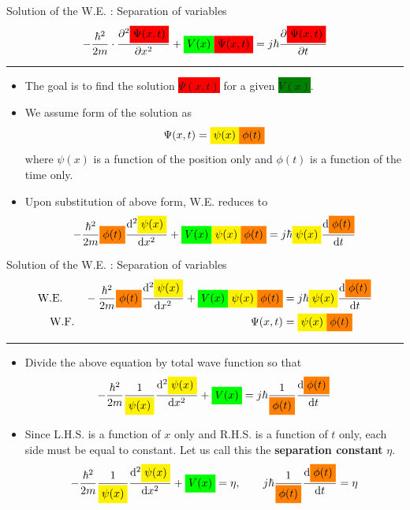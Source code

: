 \begin{frame}{Solution of the W.E. : Separation of variables}
	\[
	-\frac{\hbar^2}{2m} \cdot \frac{\partial^2 \colorbox{red}{$\Psi(x, t)$}}{\partial x^2} + \colorbox{green}{$V(x)$} \colorbox{red}{$\Psi(x, t)$}= j \hbar \frac{\partial \colorbox{red}{$\Psi(x, t)$}}{\partial t}
	\]
	\hrule
	\begin{itemize}
		\item The goal is to find the solution \colorbox{red}{$\Psi(x, t)$} for a given \colorbox{green}{$V(x)$}.
		\item We assume form of the solution as
		\[
			\Psi(x, t) = \colorbox{yellow}{$\psi(x)$} \colorbox{orange}{$\phi(t)$}
		\]
		where \(\psi(x)\) is a function of the position only and \(\phi(t)\) is a function of the time only.
		\item Upon substitution of above form, W.E. reduces to
		\[
		-\frac{\hbar^2}{2m} \colorbox{orange}{$\phi(t)$} \frac{\mathrm{d}^2 \colorbox{yellow}{$\psi(x)$}}{\mathrm{d} x^2}
		+
		\colorbox{green}{$V(x)$} \colorbox{yellow}{$\psi(x)$} \colorbox{orange}{$\phi(t)$}
		=
		j \hbar \colorbox{yellow}{$\psi(x)$}
		\frac{\mathrm{d} \colorbox{orange}{$\phi(t)$}}{\mathrm{d} t}
		\]
	\end{itemize}
\end{frame}
%
\begin{frame}{Solution of the W.E. : Separation of variables}
	\begin{align*}
	\text{W.E.} \qquad
	-\frac{\hbar^2}{2m} \colorbox{orange}{$\phi(t)$} \frac{\mathrm{d}^2 \colorbox{yellow}{$\psi(x)$}}{\mathrm{d} x^2}
	+
	\colorbox{green}{$V(x)$} \colorbox{yellow}{$\psi(x)$} \colorbox{orange}{$\phi(t)$}
	&=
	j \hbar \colorbox{yellow}{$\psi(x)$}
	\frac{\mathrm{d} \colorbox{orange}{$\phi(t)$}}{\mathrm{d} t}
	\\
	\text{W.F.} \qquad  \qquad\qquad\qquad \qquad\qquad\qquad \qquad
	\Psi(x, t) &= \colorbox{yellow}{$\psi(x)$} \colorbox{orange}{$\phi(t)$}
	\end{align*}
	\hrule
	\begin{itemize}
		\item Divide the above equation by total wave function so that
		\[
		-\frac{\hbar^2}{2m} \frac{1}{\colorbox{yellow}{$\psi(x)$}} \frac{\mathrm{d}^2 \colorbox{yellow}{$\psi(x)$}}{\mathrm{d} x^2}
		+
		\colorbox{green}{$V(x)$}
		=
		j \hbar \frac{1}{\colorbox{orange}{$\phi(t)$}}
		\frac{\mathrm{d} \colorbox{orange}{$\phi(t)$}}{\mathrm{d} t}
		\]
		\item Since L.H.S. is a function of \(x\) only and R.H.S. is a function of \(t\) only, each side must be equal to constant. Let us call this the \textbf{separation constant} \(\eta\).
		\[
		-\frac{\hbar^2}{2m} \frac{1}{\colorbox{yellow}{$\psi(x)$}} \frac{\mathrm{d}^2 \colorbox{yellow}{$\psi(x)$}}{\mathrm{d} x^2}
		+
		\colorbox{green}{$V(x)$}
		=
		\eta,
		\qquad
		j \hbar \frac{1}{\colorbox{orange}{$\phi(t)$}}
		\frac{\mathrm{d} \colorbox{orange}{$\phi(t)$}}{\mathrm{d} t}
		=
		\eta
		\]
	\end{itemize}
\end{frame}
